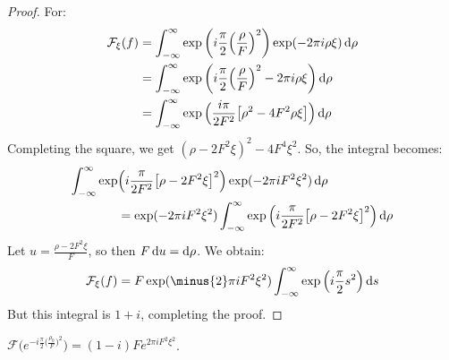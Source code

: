     \begin{proof}
    For:
    \begin{align}
        \mathcal{F}_{\xi}(f)
        &=\int_{-\infty}^{\infty}
            \exp\bigg(
                i\frac{\pi}{2}
                \Big(\frac{\rho}{F}\Big)^{2}
            \bigg)
            \exp(-2\pi{i}\rho\xi)\mathop{}\!\mathrm{d}{\rho}\\
        &=\int_{-\infty}^{\infty}
            \exp\bigg(
                i\frac{\pi}{2}\Big(
                    \frac{\rho}{F}
                \Big)^{2}-2\pi{i}\rho\xi
            \bigg)
            \mathop{}\!\mathrm{d}{\rho}\\
        &=\int_{-\infty}^{\infty}
            \exp\Big(
                \frac{i\pi}{2F^2}
                \big[\rho^2-4F^2\rho \xi\big]
            \Big)\mathop{}\!\mathrm{d}{\rho}
    \end{align}
    Completing the square, we get
    $(\rho-2F^{2}\xi)^{2}-4F^{4}\xi^{2}$.
    So, the integral becomes:
    \begin{equation}
        \begin{split}
            \int_{-\infty}^{\infty}
            \exp&\Big(
                i\frac{\pi}{2F^2}
                \big[\rho-2F^{2}\xi\big]^{2}
            \Big)
            \exp(-2\pi{i}F^{2}\xi^{2})\mathop{}\!\mathrm{d}{\rho}\\
            &=\exp(-2\pi{i}F^{2}\xi^{2})
            \int_{-\infty}^{\infty}
            \exp\Big(
                i\frac{\pi}{2F^2}
                \big[\rho-2F^{2}\xi\big]^{2}
            \Big)\mathop{}\!\mathrm{d}{\rho}
        \end{split}
    \end{equation}
    Let $u=\frac{\rho-2F^{2}\xi}{F}$, so then
    $F\mathop{}\!\mathrm{d}{u}=\mathop{}\!\mathrm{d}{\rho}$. We obtain:
    \begin{equation}
        \mathcal{F}_{\xi}(f)
        =F\exp(\minus{2}\pi{i}F^{2}\xi^{2})
            \int_{-\infty}^{\infty}
            \exp\Big(i\frac{\pi}{2}s^{2}\Big)\diff{s}
    \end{equation}
    But this integral is $1+i$, completing the proof.
    \end{proof}
    \begin{theorem}
    $\mathcal{F}(e^{-i\frac{\pi}{2}\big(\frac{\rho_0}{F}\big)^2}\big) = (1-i)Fe^{2\pi i F^2 \xi^2}$.
    \end{theorem}
